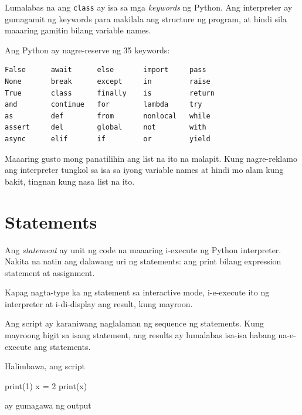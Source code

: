 \documentclass[10pt,]{book}
\newenvironment{Shaded}{}{}
\newcommand{\BuiltInTok}[1]{\textcolor[rgb]{0.00,0.50,0.00}{#1}}
\newcommand{\DecValTok}[1]{\textcolor[rgb]{0.25,0.63,0.44}{#1}}
\newcommand{\NormalTok}[1]{#1}
\newcommand{\OperatorTok}[1]{\textcolor[rgb]{0.40,0.40,0.40}{#1}}
\begin{document}
Lumalabas na ang \texttt{class} ay isa sa mga \emph{keywords} ng Python.
Ang interpreter ay gumagamit ng keywords para makilala ang structure ng
program, at hindi sila maaaring gamitin bilang variable names.


Ang Python ay nagre-reserve ng 35 keywords:

{\small
\begin{verbatim}
False      await      else       import     pass
None       break      except     in         raise
True       class      finally    is         return
and        continue   for        lambda     try
as         def        from       nonlocal   while
assert     del        global     not        with
async      elif       if         or         yield
\end{verbatim}
}

Maaaring gusto mong panatilihin ang list na ito na malapit. Kung
nagre-reklamo ang interpreter tungkol sa isa sa iyong variable names at
hindi mo alam kung bakit, tingnan kung nasa list na ito.

\section{Statements}\label{statements}

Ang \emph{statement} ay unit ng code na maaaring i-execute ng Python
interpreter. Nakita na natin ang dalawang uri ng statements: ang print
bilang expression statement at assignment.

  

Kapag nagta-type ka ng statement sa interactive mode, i-e-execute ito ng
interpreter at i-di-display ang result, kung mayroon.

Ang script ay karaniwang naglalaman ng sequence ng statements. Kung
mayroong higit sa isang statement, ang results ay lumalabas isa-isa
habang na-e-execute ang statements.

Halimbawa, ang script

\begin{Shaded}
\begin{Highlighting}[]
\BuiltInTok{print}\NormalTok{(}\DecValTok{1}\NormalTok{)}
\NormalTok{x }\OperatorTok{=} \DecValTok{2}
\BuiltInTok{print}\NormalTok{(x)}
\end{Highlighting}
\end{Shaded}

ay gumagawa ng output
\end{document}
